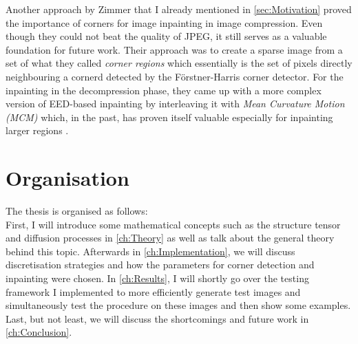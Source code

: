 Another approach by Zimmer that I already mentioned in \ref{sec:Motivation} proved the importance of corners
for image inpainting in image compression\cite{zimmer07}. Even though they could not beat the quality of JPEG, it
still serves as a valuable foundation for future work. Their approach was to create a sparse image
from a set of what they called \textit{corner regions} which essentially is the set of pixels
directly neighbouring a cornerd detected by the F\"orstner-Harris corner
detector\cite{harris88}. For the inpainting in the decompression phase, they came up with a more
complex version of EED-based inpainting by interleaving it with \textit{Mean Curvature Motion
    (MCM)} which, in the past, has proven itself valuable especially for inpainting larger regions
\cite{bertalmio00}.

\section{Organisation}

The thesis is organised as follows:\\
First, I will introduce some mathematical concepts such as the structure tensor and diffusion
processes in \ref{ch:Theory} as well as talk about the general theory behind this topic.
Afterwards in \ref{ch:Implementation}, we will discuss discretisation strategies and how the
parameters for corner detection and inpainting were chosen.
In \ref{ch:Results}, I will shortly go over the testing framework I implemented to more efficiently
generate test images and simultaneously test the procedure on these images and then show some
examples.
Last, but not least, we will discuss the shortcomings and future work in \ref{ch:Conclusion}.
